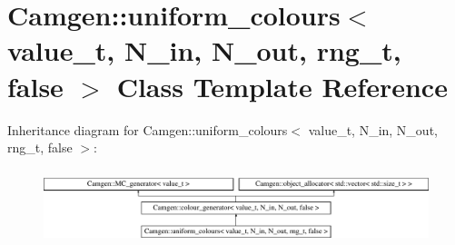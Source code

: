 \hypertarget{a00558}{}\section{Camgen\+:\+:uniform\+\_\+colours$<$ value\+\_\+t, N\+\_\+in, N\+\_\+out, rng\+\_\+t, false $>$ Class Template Reference}
\label{a00558}
Inheritance diagram for Camgen\+:\+:uniform\+\_\+colours$<$ value\+\_\+t, N\+\_\+in, N\+\_\+out, rng\+\_\+t, false $>$\+:\begin{figure}[H]
\begin{center}
\leavevmode
\includegraphics[height=2.216359cm]{a00558}
\end{center}
\end{figure}
